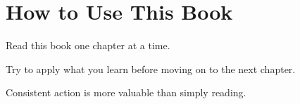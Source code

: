 \section{How to Use This Book}

Read this book one chapter at a time.

Try to apply what you learn before moving on to the next chapter.

Consistent action is more valuable than simply reading.